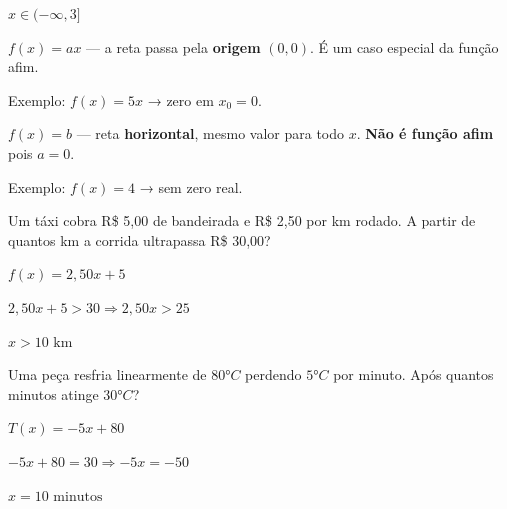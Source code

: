 \documentclass[12pt]{article}
\begin{document}
\begin{multicols}{2}
$\boxed{x \in (-\infty, 3]}$



$f(x) = ax$ — a reta passa pela \textbf{origem} $(0, 0)$.
É um caso especial da função afim.

Exemplo: $f(x) = 5x$ → zero em $x_0 = 0$.


$f(x) = b$ — reta \textbf{horizontal}, mesmo valor para todo $x$.
\textbf{Não é função afim} pois $a = 0$.

Exemplo: $f(x) = 4$ → sem zero real.

\vspace{0.2cm}



Um táxi cobra R\$ 5,00 de bandeirada e R\$ 2,50 por km rodado.
A partir de quantos km a corrida ultrapassa R\$ 30,00?

$f(x) = 2{,}50x + 5$\vspace{4pt}

$2{,}50x + 5 > 30 \Rightarrow 2{,}50x > 25$\vspace{4pt}

$\boxed{x > 10 \text{ km}}$


Uma peça resfria linearmente de $80°C$ perdendo $5°C$ por minuto.
Após quantos minutos atinge $30°C$?

$T(x) = -5x + 80$\vspace{4pt}

$-5x + 80 = 30 \Rightarrow -5x = -50$\vspace{4pt}

$\boxed{x = 10 \text{ minutos}}$

\end{multicols}


\end{document}
